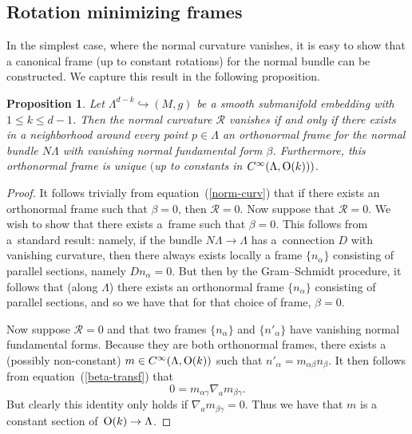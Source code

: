 \documentclass[pdftex]{sigma}
\numberwithin{equation}{section}
\newtheorem{Proposition}[Theorem]{Proposition}
 { \theoremstyle{definition}
\newtheorem{Definition}[Theorem]{Definition}
\newtheorem{Note}[Theorem]{Note}
\newtheorem{Problem}[Theorem]{Problem}
\newtheorem{Example}[Theorem]{Example}
\newtheorem{Remark}[Theorem]{Remark} }
\renewcommand{\=}{\stackrel \Lambda =}
\begin{document}
\subsection{Rotation minimizing frames}

In the simplest case, where the normal curvature vanishes, it is easy to show that a canonical frame (up to constant rotations) for the normal bundle can be constructed. We capture this result in the following proposition.
\begin{Proposition} \label{riem-canonical-frame}
Let $\Lambda^{d-k} \hookrightarrow (M,g)$ be a smooth submanifold embedding with $1 \leq k \leq d-1$. Then the normal curvature $\mathcal{R}$ vanishes if and only if there exists in a neighborhood around every point $p \in \Lambda$ an orthonormal frame for the normal bundle $N \Lambda$ with vanishing normal fundamental form $\beta$. Furthermore, this orthonormal frame is unique $($up to constants in $C^\infty(\Lambda,{\rm O}(k)))$.
\end{Proposition}
\begin{proof}
It follows trivially from equation~(\ref{norm-curv}) that if there exists an orthonormal frame such that $\beta = 0$, then $\mathcal{R} = 0$. Now suppose that $\mathcal{R} = 0$. We wish to show that there exists a~frame such that $\beta = 0$. This follows from a~standard result: namely, if the bundle $N \Lambda \rightarrow \Lambda$ has a~connection $D$ with vanishing curvature, then there always exists locally a frame $\{n_{\alpha}\}$ consisting of parallel sections, namely $D n_{\alpha} = 0$. But then by the Gram--Schmidt procedure, it follows that (along $\Lambda$) there exists an orthonormal frame $\{n_{\alpha}\}$ consisting of parallel sections, and so we have that for that choice of frame, $\beta = 0$.

Now suppose $\mathcal{R} = 0$ and that two frames $\{n_{\alpha}\}$ and $\{n'_{\alpha}\}$ have vanishing normal fundamental forms. Because they are both orthonormal frames, there exists a (possibly non-constant) $m \in C^\infty(\Lambda, {\rm O}(k))$ such that $n'_{\alpha} = m_{\alpha \beta} n_{\beta}$. It then follows from equation~(\ref{beta-transf}) that
\[
0 = m_{\alpha \gamma} \nabla_a m_{\beta \gamma} .
\]
But clearly this identity only holds if $\nabla_a m_{\beta \gamma} = 0$. Thus we have that $m$ is a constant section of~${{\rm O}(k) \rightarrow \Lambda}$.
\end{proof}
\end{document}
